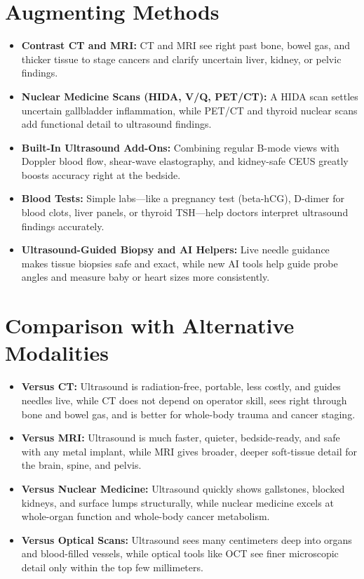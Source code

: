 \section{Augmenting Methods}
\begin{itemize}
  \item \textbf{Contrast CT and MRI:} CT and MRI see right past bone, bowel gas, and thicker tissue to stage cancers and clarify uncertain liver, kidney, or pelvic findings.
  \item \textbf{Nuclear Medicine Scans (HIDA, V/Q, PET/CT):} A HIDA scan settles uncertain gallbladder inflammation, while PET/CT and thyroid nuclear scans add functional detail to ultrasound findings.
  \item \textbf{Built-In Ultrasound Add-Ons:} Combining regular B-mode views with Doppler blood flow, shear-wave elastography, and kidney-safe CEUS greatly boosts accuracy right at the bedside.
  \item \textbf{Blood Tests:} Simple labs---like a pregnancy test (beta-hCG), D-dimer for blood clots, liver panels, or thyroid TSH---help doctors interpret ultrasound findings accurately.
  \item \textbf{Ultrasound-Guided Biopsy and AI Helpers:} Live needle guidance makes tissue biopsies safe and exact, while new AI tools help guide probe angles and measure baby or heart sizes more consistently.
\end{itemize}

\section{Comparison with Alternative Modalities}
\begin{itemize}
  \item \textbf{Versus CT:} Ultrasound is radiation-free, portable, less costly, and guides needles live, while CT does not depend on operator skill, sees right through bone and bowel gas, and is better for whole-body trauma and cancer staging.
  \item \textbf{Versus MRI:} Ultrasound is much faster, quieter, bedside-ready, and safe with any metal implant, while MRI gives broader, deeper soft-tissue detail for the brain, spine, and pelvis.
  \item \textbf{Versus Nuclear Medicine:} Ultrasound quickly shows gallstones, blocked kidneys, and surface lumps structurally, while nuclear medicine excels at whole-organ function and whole-body cancer metabolism.
  \item \textbf{Versus Optical Scans:} Ultrasound sees many centimeters deep into organs and blood-filled vessels, while optical tools like OCT see finer microscopic detail only within the top few millimeters.
\end{itemize}

